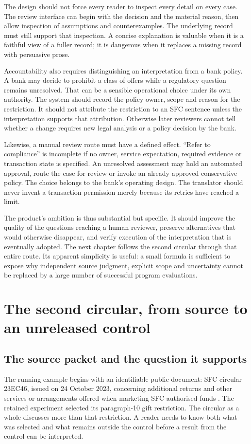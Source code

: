 \documentclass[12pt,a4paper,oneside,openany]{book}
\begin{document}
The design should not force every reader to inspect every detail on every case.
The review interface can begin with the decision and the material reason, then
allow inspection of assumptions and counterexamples. The underlying record must
still support that inspection. A concise explanation is valuable when it is a
faithful view of a fuller record; it is dangerous when it replaces a missing
record with persuasive prose.

Accountability also requires distinguishing an interpretation from a bank policy.
A bank may decide to prohibit a class of offers while a regulatory question
remains unresolved. That can be a sensible operational choice under its own
authority. The system should record the policy owner, scope and reason for the
restriction. It should not attribute the restriction to an SFC sentence unless
the interpretation supports that attribution. Otherwise later reviewers cannot
tell whether a change requires new legal analysis or a policy decision by the
bank.

Likewise, a manual review route must have a defined effect. ``Refer to compliance''
is incomplete if no owner, service expectation, required evidence or transaction
state is specified. An unresolved assessment may hold an automated approval,
route the case for review or invoke an already approved conservative policy. The
choice belongs to the bank's operating design. The translator should never
invent a transaction permission merely because its retries have reached a limit.

The product's ambition is thus substantial but specific. It should improve the
quality of the questions reaching a human reviewer, preserve alternatives that
would otherwise disappear, and verify execution of the interpretation that is
eventually adopted. The next chapter follows the second circular through that
entire route. Its apparent simplicity is useful: a small formula is sufficient
to expose why independent source judgment, explicit scope and uncertainty cannot
be replaced by a large number of successful program evaluations.

\chapter{The second circular, from source to an unreleased control}
\label{ch:circular}

\section{The source packet and the question it supports}
\label{sec:circular-packet}
The running example begins with an identifiable public document: SFC circular
23EC46, issued on 24 October 2023, concerning additional returns and other
services or arrangements offered when marketing SFC-authorised funds
\citep{sfcmarketing}. The retained experiment selected its paragraph-10 gift
restriction. The circular as a whole discusses more than that restriction. A
reader needs to know both what was selected and what remains outside the control
before a result from the control can be interpreted.
\end{document}
